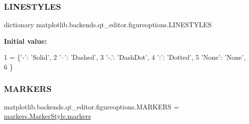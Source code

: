 \subsubsection{\texorpdfstring{L\+I\+N\+E\+S\+T\+Y\+L\+ES}{LINESTYLES}}
{\footnotesize\ttfamily dictionary matplotlib.\+backends.\+qt\+\_\+editor.\+figureoptions.\+L\+I\+N\+E\+S\+T\+Y\+L\+ES}

{\bfseries Initial value\+:}
\begin{DoxyCode}
1 =  \{\textcolor{stringliteral}{'-'}: \textcolor{stringliteral}{'Solid'},
2               \textcolor{stringliteral}{'--'}: \textcolor{stringliteral}{'Dashed'},
3               \textcolor{stringliteral}{'-.'}: \textcolor{stringliteral}{'DashDot'},
4               \textcolor{stringliteral}{':'}: \textcolor{stringliteral}{'Dotted'},
5               \textcolor{stringliteral}{'None'}: \textcolor{stringliteral}{'None'},
6               \}
\end{DoxyCode}
\mbox{\label{namespacematplotlib_1_1backends_1_1qt__editor_1_1figureoptions_ac6ac756e054b4acae50beef88c56f4db}} 
\subsubsection{\texorpdfstring{M\+A\+R\+K\+E\+RS}{MARKERS}}
{\footnotesize\ttfamily matplotlib.\+backends.\+qt\+\_\+editor.\+figureoptions.\+M\+A\+R\+K\+E\+RS = \hyperlink{classmatplotlib_1_1markers_1_1MarkerStyle_a0ddfb9c88144670b3551f8b36c07fab1}{markers.\+Marker\+Style.\+markers}}

